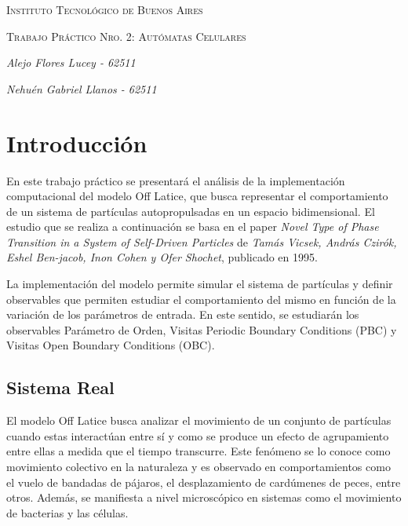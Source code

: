 \documentclass[11pt]{article}
\begin{document}
    \begin{titlepage}
        \centering

        {\scshape\Large Instituto Tecnológico de Buenos Aires \\ \par}
        \vspace{1cm}

        {\scshape\huge Trabajo Práctico Nro. 2: Autómatas Celulares \par}
        \vspace{2cm}

        {\Large\itshape Alejo Flores Lucey - 62511\par}
        {\Large\itshape Nehuén Gabriel Llanos - 62511\par}
        \vfill

    \end{titlepage}

    \section{Introducción}

        En este trabajo práctico se presentará el análisis de la implementación computacional del modelo Off Latice, que busca
        representar el comportamiento de un sistema de partículas autopropulsadas en un espacio bidimensional. El estudio que se
        realiza a continuación se basa en el paper \textit{Novel Type of Phase Transition in a System of Self-Driven Particles} de
        \textit{Tamás Vicsek, András Czirók, Eshel Ben-jacob, Inon Cohen y Ofer Shochet}, publicado en 1995.

        La implementación del modelo permite simular el sistema de partículas y definir observables que permiten estudiar el
        comportamiento del mismo en función de la variación de los parámetros de entrada. En este sentido, se estudiarán los
        observables Parámetro de Orden, Visitas Periodic Boundary Conditions (PBC) y Visitas Open Boundary Conditions (OBC).

        \subsection{Sistema Real}


            El modelo Off Latice busca analizar el movimiento de un conjunto de partículas cuando estas interactúan entre sí y
            como se produce un efecto de agrupamiento entre ellas a medida que el tiempo transcurre. Este fenómeno se lo conoce
            como movimiento colectivo en la naturaleza y es observado en comportamientos como el vuelo de bandadas de pájaros,
            el desplazamiento de cardúmenes de peces, entre otros. Además, se manifiesta a nivel microscópico en sistemas como
            el movimiento de bacterias y las células.
\end{document}
